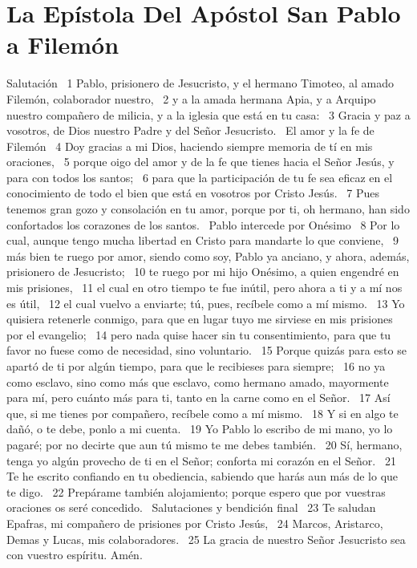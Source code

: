 \chapter{La Epístola Del Apóstol San Pablo a Filemón}

Salutación  
1 Pablo, prisionero de Jesucristo, y el hermano Timoteo, al amado Filemón, colaborador nuestro,  
2 y a la amada hermana Apia, y a Arquipo nuestro compañero de milicia, y a la iglesia que está en tu casa:  
3 Gracia y paz a vosotros, de Dios nuestro Padre y del Señor Jesucristo.  
El amor y la fe de Filemón 
4 Doy gracias a mi Dios, haciendo siempre memoria de tí en mis oraciones,  
5 porque oigo del amor y de la fe que tienes hacia el Señor Jesús, y para con todos los santos;  
6 para que la participación de tu fe sea eficaz en el conocimiento de todo el bien que está en vosotros por Cristo Jesús.  
7 Pues tenemos gran gozo y consolación en tu amor, porque por ti, oh hermano, han sido confortados los corazones de los santos.  
Pablo intercede por Onésimo  
8 Por lo cual, aunque tengo mucha libertad en Cristo para mandarte lo que conviene,  
9 más bien te ruego por amor, siendo como soy, Pablo ya anciano, y ahora, además, prisionero de Jesucristo;  
10 te ruego por mi hijo Onésimo, a quien engendré en mis prisiones,  
11 el cual en otro tiempo te fue inútil, pero ahora a ti y a mí nos es útil,  
12 el cual vuelvo a enviarte; tú, pues, recíbele como a mí mismo.  
13 Yo quisiera retenerle conmigo, para que en lugar tuyo me sirviese en mis prisiones por el evangelio;  
14 pero nada quise hacer sin tu consentimiento, para que tu favor no fuese como de necesidad, sino voluntario.  
15 Porque quizás para esto se apartó de ti por algún tiempo, para que le recibieses para siempre;  
16 no ya como esclavo, sino como más que esclavo, como hermano amado, mayormente para mí, pero cuánto más para ti, tanto en la carne como en el Señor.  
17 Así que, si me tienes por compañero, recíbele como a mí mismo.  
18 Y si en algo te dañó, o te debe, ponlo a mi cuenta.  
19 Yo Pablo lo escribo de mi mano, yo lo pagaré; por no decirte que aun tú mismo te me debes también.  
20 Sí, hermano, tenga yo algún provecho de ti en el Señor; conforta mi corazón en el Señor.  
21 Te he escrito confiando en tu obediencia, sabiendo que harás aun más de lo que te digo.  
22 Prepárame también alojamiento; porque espero que por vuestras oraciones os seré concedido.  
Salutaciones y bendición final  
23 Te saludan Epafras, mi compañero de prisiones por Cristo Jesús,  
24 Marcos, Aristarco, Demas y Lucas, mis colaboradores.  
25 La gracia de nuestro Señor Jesucristo sea con vuestro espíritu. Amén. 
